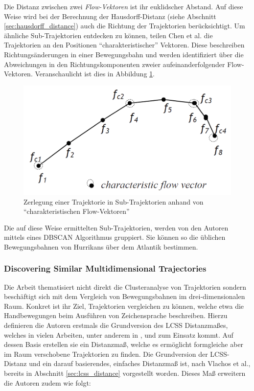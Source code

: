 Die Distanz zwischen zwei \textit{Flow-Vektoren} ist ihr euklidscher Abstand. Auf diese Weise wird bei
der Berechnung der Hausdorff-Distanz (siehe Abschnitt \ref{sec:hausdorff_distance}) auch die Richtung
der Trajektorien berücksichtigt.
Um ähnliche Sub-Trajektorien entdecken zu können, teilen Chen et al. die Trajektorien an den Positionen
``charakteristischer'' Vektoren. Diese beschreiben Richtungsänderungen in einer
Bewegungsbahn und werden identifiziert über die Abweichungen in den Richtungskomponenten zweier
aufeinanderfolgender Flow-Vektoren.
Veranschaulicht ist dies in Abbildung \ref{fig:relw_chen_flow_vector}.

\begin{figure}[H]
    \centering
    \includegraphics[width=0.45\linewidth]{resources/img/RelatedWork/Chen_trajectory_splitting}
    \caption[Zerlegung einer Trajektorie in Sub-Trajektorien (Chen et al.)]
            {Zerlegung einer Trajektorie in Sub-Trajektorien anhand von ``charakteristischen Flow-Vektoren'' \cite[]{Chen2011}}
    \label{fig:relw_chen_flow_vector}
\end{figure}

Die auf diese Weise ermittelten Sub-Trajektorien, werden von den Autoren mittels eines DBSCAN Algorithmus gruppiert.
Sie können so die üblichen Bewegungsbahnen von Hurrikans über dem Atlantik bestimmen.


\subsubsection*{Discovering Similar Multidimensional Trajectories}
\label{sec:relw_vlachos}
Die Arbeit \cite[]{Vlachos2002} thematisiert nicht direkt die Clusteranalyse von Trajektorien sondern
beschäftigt sich mit dem Vergleich von Bewegungsbahnen im drei-dimensionalen Raum. Konkret ist ihr Ziel,
Trajektorien vergleichen zu können, welche etwa die Handbewegungen beim Ausführen von Zeichensprache beschreiben.
Hierzu definieren die Autoren erstmals die Grundversion des LCSS Distanzmaßes, welches in vielen Arbeiten,
unter anderem in \cite[]{Atev2006}, \cite[]{Buzan2004} und \cite[]{Chen2005} zum Einsatz kommt.
Auf dessen Basis erstellen sie ein Distanzmaß, welche es ermöglicht formgleiche aber im Raum verschobene Trajektorien zu finden.
Die Grundversion der LCSS-Distanz und ein darauf basierendes, einfaches Distanzmaß ist, nach Vlachos et al.,
bereits in Abschnitt \ref{sec:lcss_distance} vorgestellt worden.
Dieses Maß erweitern die Autoren zudem wie folgt:

